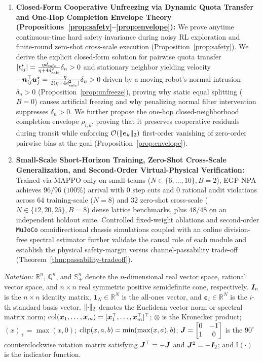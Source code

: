 \begin{enumerate}
 \item \textbf{Closed-Form Cooperative Unfreezing via Dynamic Quota Transfer and One-Hop Completion Envelope Theory (Propositions~\ref{prop:safety}--\ref{prop:envelope}):} We prove anytime continuous-time hard safety invariance during noisy RL exploration and finite-round zero-shot cross-scale execution (Proposition~\ref{prop:safety}). We derive the explicit closed-form solution for pairwise quota transfer $|t_{ij}^\star|=\frac{\eta d_{\mathrm{safe}}}{\eta+4d_{\mathrm{safe}}^2}\delta_n>0$ and stationary neighbor yielding velocity $-\boldsymbol n_{ij}^{\top}\boldsymbol{u}_j^\star=\frac{\eta}{2(\eta+4d_{\mathrm{safe}}^2)}\delta_n>0$ driven by a moving robot's normal intrusion $\delta_n>0$ (Proposition~\ref{prop:unfreeze}), proving why static equal splitting ($B=0$) causes artificial freezing and why penalizing normal filter intervention suppresses $\delta_n>0$. We further propose the one-hop closed-neighborhood completion envelope $\rho_{i,k}$, proving that it preserves cooperative residuals during transit while enforcing $\mathcal O(\lVert\boldsymbol{e}_k\rVert_2)$ first-order vanishing of zero-order pairwise bias at the goal (Proposition~\ref{prop:envelope}).
 \item \textbf{Small-Scale Short-Horizon Training, Zero-Shot Cross-Scale Generalization, and Second-Order Virtual-Physical Verification:} Trained via MAPPO only on small teams ($N\in\{6,\dots,10\},B=2$), EGP-NPA achieves $96/96$ ($100\%$) arrival with $0$ step cuts and $0$ rational audit violations across $64$ training-scale ($N=8$) and $32$ zero-shot cross-scale ($N\in\{12,20,25\},B=8$) dense lattice benchmarks, plus $48/48$ on an independent holdout suite. Controlled fixed-weight ablations and second-order \texttt{MuJoCo} omnidirectional chassis simulations coupled with an online division-free spectral estimator further validate the causal role of each module and establish the physical safety-margin versus channel-passability trade-off (Theorem~\ref{thm:passability-tradeoff}).
\end{enumerate}

\emph{Notation:} $\mathbb R^n$, $\mathbb Q^n$, and $\mathbb S_+^n$ denote the $n$-dimensional real vector space, rational vector space, and $n\times n$ real symmetric positive semidefinite cone, respectively. $\boldsymbol{I}_n$ is the $n\times n$ identity matrix, $\boldsymbol 1_N\in\mathbb R^N$ is the all-ones vector, and $\boldsymbol\varepsilon_i\in\mathbb R^N$ is the $i$-th standard basis vector. $\lVert\cdot\rVert_2$ denotes the Euclidean vector norm or spectral matrix norm; $\operatorname{col}(\boldsymbol x_1,\dots,\boldsymbol x_m)=[\boldsymbol x_1^{\top},\dots,\boldsymbol x_m^{\top}]^{\top}$; $\otimes$ is the Kronecker product; $(x)_+=\max(x,0)$; $\operatorname{clip}(x,a,b)=\min(\max(x,a),b)$; $\boldsymbol{J}=\begin{bmatrix}0&-1\\1&0\end{bmatrix}$ is the $90^\circ$ counterclockwise rotation matrix satisfying $\boldsymbol{J}^{\top}=-\boldsymbol{J}$ and $\boldsymbol{J}^2=-\boldsymbol{I}_2$; and $\mathbb I(\cdot)$ is the indicator function.
